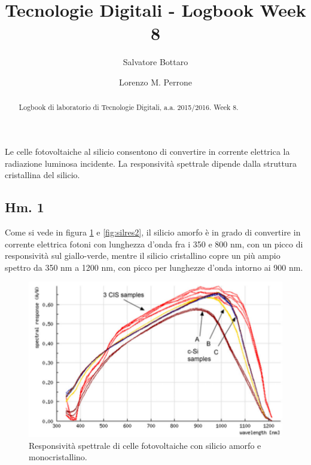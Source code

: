 \documentclass[journal, a4paper]{IEEEtran}
\begin{document}
	\title{Tecnologie Digitali - Logbook Week 8}
	\author[1]{Salvatore Bottaro}
		\author[2]{Lorenzo M. Perrone}
	\maketitle
	
\begin{abstract}
	Logbook di laboratorio di Tecnologie Digitali, a.a. 2015/2016. Week 8.
\end{abstract}

Le celle fotovoltaiche al silicio consentono di convertire in corrente elettrica la radiazione luminosa incidente. La responsività spettrale dipende dalla struttura cristallina del silicio.

\subsection{Hm. 1}

Come si vede in figura \ref{fig:silres1} e \ref{fig:silres2}, il silicio amorfo è in grado di convertire in corrente elettrica fotoni con lunghezza d'onda fra i 350 e 800 nm, con un picco di responsività sul giallo-verde, mentre il silicio cristallino copre un più ampio spettro da 350 nm a 1200 nm, con picco per lunghezze d'onda intorno ai 900 nm.

\begin{figure}[htp]
\centering
\includegraphics[scale=.5]{c-Si_SR}
\caption{Responsività spettrale di celle fotovoltaiche con silicio amorfo e monocristallino.}
\label{fig:silres1}
\end{figure}
\end{document}

